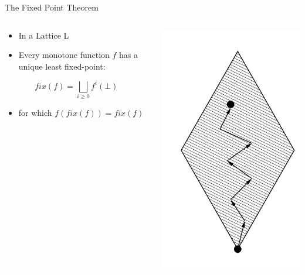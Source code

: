 \begin{frame}{The Fixed Point Theorem}
  \begin{columns}[c]
    \begin{column}{0.8\textwidth}
      \begin{itemize}
      \item In a Lattice L
      \item Every monotone function $f$ has a unique least fixed-point:
      \end{itemize}
\[ fix(f) = \bigsqcup_{i \ge 0} f^i(\bot) \]

\begin{itemize}
\item for which $f(fix(f)) = fix(f)$
\end{itemize}
    \end{column}

    \begin{column}{0.2\textwidth}
      \includegraphics[width=\textwidth]{graphics/fixed-point_walk}
    \end{column}
  \end{columns}
\end{frame}

